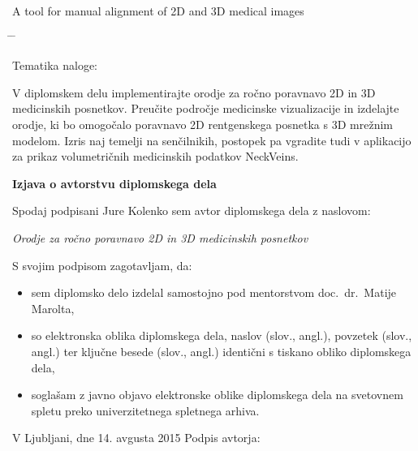 \documentclass[a4paper, 12pt]{book}
\newcommand{\clearemptydoublepage}{\newpage{\pagestyle{empty}\cleardoublepage}}
\begin{document}
A tool for manual alignment of 2D and 3D medical images
\begin{tabbing}
\hspace{32mm}\= \hspace{6cm} \= \kill




Tematika naloge:
\end{tabbing}
V diplomskem delu implementirajte orodje za ročno poravnavo 2D in 3D medicinskih posnetkov. Preučite področje medicinske vizualizacije in izdelajte orodje, ki bo omogočalo poravnavo 2D rentgenskega posnetka s 3D mrežnim modelom. Izris naj temelji na senčilnikih, postopek pa vgradite tudi v aplikacijo za prikaz volumetričnih medicinskih podatkov NeckVeins.
\vspace{15mm}
\vspace{2cm}

\clearemptydoublepage

\vspace*{1cm}
\begin{center}
{\Large \textbf{\sc Izjava o avtorstvu diplomskega dela}}
\end{center}

\vspace{1cm}
\noindent Spodaj podpisani Jure Kolenko sem avtor diplomskega dela z naslovom:

\vspace{0.5cm}
\emph{Orodje za ročno poravnavo 2D in 3D medicinskih posnetkov}

\vspace{1.5cm}
\noindent S svojim podpisom zagotavljam, da:
\begin{itemize}
	\item sem diplomsko delo izdelal samostojno pod mentorstvom
		doc.\ dr.\ Matije Marolta,

	\item	so elektronska oblika diplomskega dela, naslov (slov., angl.), povzetek (slov., angl.) ter ključne besede (slov., angl.) identični s tiskano obliko diplomskega dela,
	\item soglašam z javno objavo elektronske oblike diplomskega dela na svetovnem spletu preko univerzitetnega spletnega arhiva.	
\end{itemize}

\vspace{1cm}
\noindent V Ljubljani, dne 14. avgusta 2015 \hfill Podpis avtorja:

\clearemptydoublepage
\end{document}
